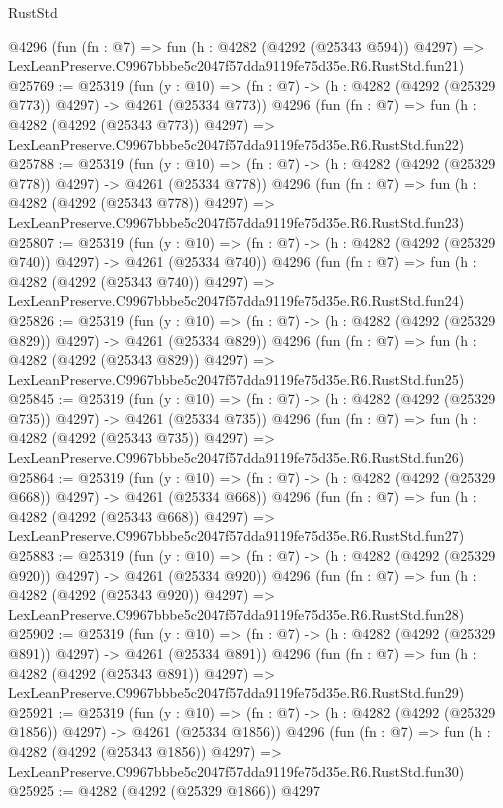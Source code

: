 \begin{lexlean}{RustStd}
\begin{coremodule}
    @4296
    (fun (fn : @7) =>
    fun (h : @4282 (@4292 (@25343 @594)) @4297) =>
    LexLeanPreserve.C9967bbbe5c2047f57dda9119fe75d35e.R6.RustStd.fun21)
@25769 := @25319
    (fun (y : @10) => (fn : @7) -> (h : @4282 (@4292 (@25329 @773)) @4297) -> @4261 (@25334 @773))
    @4296
    (fun (fn : @7) =>
    fun (h : @4282 (@4292 (@25343 @773)) @4297) =>
    LexLeanPreserve.C9967bbbe5c2047f57dda9119fe75d35e.R6.RustStd.fun22)
@25788 := @25319
    (fun (y : @10) => (fn : @7) -> (h : @4282 (@4292 (@25329 @778)) @4297) -> @4261 (@25334 @778))
    @4296
    (fun (fn : @7) =>
    fun (h : @4282 (@4292 (@25343 @778)) @4297) =>
    LexLeanPreserve.C9967bbbe5c2047f57dda9119fe75d35e.R6.RustStd.fun23)
@25807 := @25319
    (fun (y : @10) => (fn : @7) -> (h : @4282 (@4292 (@25329 @740)) @4297) -> @4261 (@25334 @740))
    @4296
    (fun (fn : @7) =>
    fun (h : @4282 (@4292 (@25343 @740)) @4297) =>
    LexLeanPreserve.C9967bbbe5c2047f57dda9119fe75d35e.R6.RustStd.fun24)
@25826 := @25319
    (fun (y : @10) => (fn : @7) -> (h : @4282 (@4292 (@25329 @829)) @4297) -> @4261 (@25334 @829))
    @4296
    (fun (fn : @7) =>
    fun (h : @4282 (@4292 (@25343 @829)) @4297) =>
    LexLeanPreserve.C9967bbbe5c2047f57dda9119fe75d35e.R6.RustStd.fun25)
@25845 := @25319
    (fun (y : @10) => (fn : @7) -> (h : @4282 (@4292 (@25329 @735)) @4297) -> @4261 (@25334 @735))
    @4296
    (fun (fn : @7) =>
    fun (h : @4282 (@4292 (@25343 @735)) @4297) =>
    LexLeanPreserve.C9967bbbe5c2047f57dda9119fe75d35e.R6.RustStd.fun26)
@25864 := @25319
    (fun (y : @10) => (fn : @7) -> (h : @4282 (@4292 (@25329 @668)) @4297) -> @4261 (@25334 @668))
    @4296
    (fun (fn : @7) =>
    fun (h : @4282 (@4292 (@25343 @668)) @4297) =>
    LexLeanPreserve.C9967bbbe5c2047f57dda9119fe75d35e.R6.RustStd.fun27)
@25883 := @25319
    (fun (y : @10) => (fn : @7) -> (h : @4282 (@4292 (@25329 @920)) @4297) -> @4261 (@25334 @920))
    @4296
    (fun (fn : @7) =>
    fun (h : @4282 (@4292 (@25343 @920)) @4297) =>
    LexLeanPreserve.C9967bbbe5c2047f57dda9119fe75d35e.R6.RustStd.fun28)
@25902 := @25319
    (fun (y : @10) => (fn : @7) -> (h : @4282 (@4292 (@25329 @891)) @4297) -> @4261 (@25334 @891))
    @4296
    (fun (fn : @7) =>
    fun (h : @4282 (@4292 (@25343 @891)) @4297) =>
    LexLeanPreserve.C9967bbbe5c2047f57dda9119fe75d35e.R6.RustStd.fun29)
@25921 := @25319
    (fun (y : @10) => (fn : @7) -> (h : @4282 (@4292 (@25329 @1856)) @4297) -> @4261 (@25334 @1856))
    @4296
    (fun (fn : @7) =>
    fun (h : @4282 (@4292 (@25343 @1856)) @4297) =>
    LexLeanPreserve.C9967bbbe5c2047f57dda9119fe75d35e.R6.RustStd.fun30)
@25925 := @4282 (@4292 (@25329 @1866)) @4297

\end{coremodule}
\end{lexlean}
